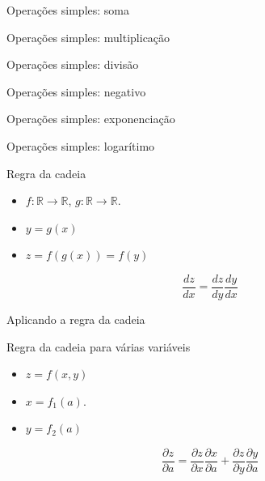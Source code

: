 \documentclass[10pt]{beamer}
\begin{document}
\begin{frame}{Operações simples: soma}

\end{frame}

\begin{frame}{Operações simples: multiplicação}

\end{frame}

\begin{frame}{Operações simples: divisão}

\end{frame}

\begin{frame}{Operações simples: negativo}

\end{frame}

\begin{frame}{Operações simples: exponenciação}

\end{frame}

\begin{frame}{Operações simples: logarítimo}

\end{frame}

\begin{frame}{Regra da cadeia}
\Large{
\begin{itemize}
\item $f:\mathbb{R} \rightarrow\mathbb{R}$, $g:\mathbb{R} \rightarrow\mathbb{R}$. 
\item $y = g(x)$
\item $z = f(g(x)) = f(y)$
\end{itemize}
\[
\frac{dz}{dx} = \frac{dz}{dy} \frac{dy}{dx} 
\]
}
\end{frame}


\begin{frame}{Aplicando a regra da cadeia}

\end{frame}

\begin{frame}{Regra da cadeia para várias variáveis}
\Large{
\begin{itemize}
\item $z = f(x,y)$
\item $x = f_{1}(a)$. 
\item $y = f_{2}(a)$
\end{itemize}
\[
\frac{\partial z}{ \partial a} = \frac{\partial z}{\partial x} \frac{\partial x}{\partial a} + \frac{\partial z}{\partial y} \frac{\partial y}{\partial a} 
\]
}
\end{frame}
\end{document}
